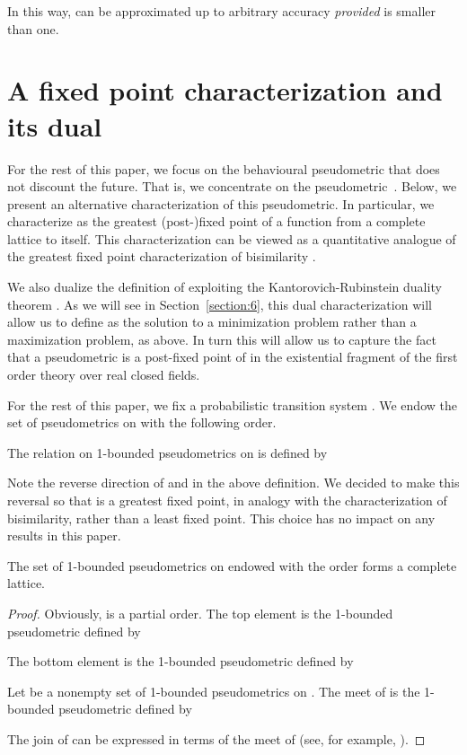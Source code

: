 \documentclass{LMCS}
\begin{document}
In this way,  can be approximated up to arbitrary accuracy
\emph{provided}  is smaller than one.

\section{A fixed point characterization and its dual}
\label{section:4}

For the rest of this paper, we focus on the behavioural pseudometric
that does not discount the future.  That is, we concentrate on the
pseudometric~.  Below, we present an alternative characterization
of this pseudometric.  In particular, we characterize  as the
greatest (post-)fixed point of a function  from a complete
lattice to itself.  This characterization can be viewed as a
quantitative analogue of the greatest fixed point characterization of
bisimilarity \cite{P81:tcs}.

We also dualize the definition of  exploiting the Kantorovich-Rubinstein
duality theorem \cite{KR58:vestni}.  As we will see in Section~\ref{section:6},
this dual characterization will allow us to define  as the solution to a minimization
problem rather than a maximization problem, as above.  In turn this will allow us to capture
the fact that a pseudometric is a post-fixed point of  in the existential fragment
of the first order theory over real closed fields.

For the rest of this paper, we fix a probabilistic transition
system .  We endow the set of pseudometrics on  with
the following order.

\begin{defi}
The relation  on 1-bounded pseudometrics on  is defined by

\end{defi}

Note the reverse direction of  and  in the above
definition.  We decided to make this reversal so that  is a
greatest fixed point, in analogy with the characterization of bisimilarity,
rather than a least fixed point.  This choice has no impact on any
results in this paper.

\begin{prop}
\label{proposition:3}
The set of 1-bounded pseudometrics on  endowed with the order
 forms a complete lattice.
\end{prop}
\begin{proof}
Obviously,  is a partial order.  The top element is
the 1-bounded pseudometric  defined by

The bottom element is the 1-bounded pseudometric  defined by

Let  be a nonempty set of 1-bounded pseudometrics on .  The
meet of  is the 1-bounded pseudometric  defined by

The join of  can be expressed in terms of the meet of 
(see, for example, \cite[Lemma~2.15]{DP90}).
\end{proof}
\end{document}
